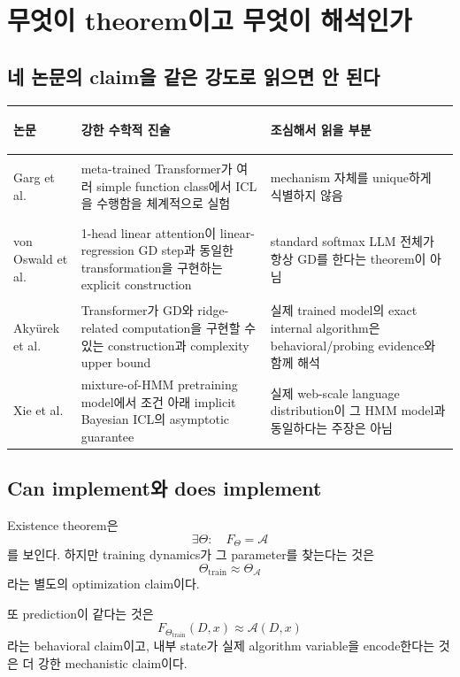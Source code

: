 \documentclass[11pt,a4paper,oneside,openany]{memoir}
\theoremstyle{definition}
\begin{document}
\chapter{무엇이 theorem이고 무엇이 해석인가}

\section{네 논문의 claim을 같은 강도로 읽으면 안 된다}

\begin{center}
\small
\begin{tabularx}{\textwidth}{>{\bfseries\raggedright\arraybackslash}p{}Y Y}
\toprule
논문 & 강한 수학적 진술 & 조심해서 읽을 부분 \\
\midrule
Garg et al. & meta-trained Transformer가 여러 simple function class에서 ICL을 수행함을 체계적으로 실험 & mechanism 자체를 unique하게 식별하지 않음 \\
von Oswald et al. & 1-head linear attention이 linear-regression GD step과 동일한 transformation을 구현하는 explicit construction & standard softmax LLM 전체가 항상 GD를 한다는 theorem이 아님 \\
Akyürek et al. & Transformer가 GD와 ridge-related computation을 구현할 수 있는 construction과 complexity upper bound & 실제 trained model의 exact internal algorithm은 behavioral/probing evidence와 함께 해석 \\
Xie et al. & mixture-of-HMM pretraining model에서 조건 아래 implicit Bayesian ICL의 asymptotic guarantee & 실제 web-scale language distribution이 그 HMM model과 동일하다는 주장은 아님 \\
\bottomrule
\end{tabularx}
\end{center}

\section{Can implement와 does implement}

Existence theorem은
\[
\exists\Theta:\quad F_\Theta=\mathcal A
\]
를 보인다.
하지만 training dynamics가 그 parameter를 찾는다는 것은
\[
\Theta_{\mathrm{train}}\approx\Theta_{\mathcal A}
\]
라는 별도의 optimization claim이다.

또 prediction이 같다는 것은
\[
F_{\Theta_{\mathrm{train}}}(D,x)
\approx
\mathcal A(D,x)
\]
라는 behavioral claim이고,
내부 state가 실제 algorithm variable을 encode한다는 것은 더 강한 mechanistic claim이다.
\end{document}
